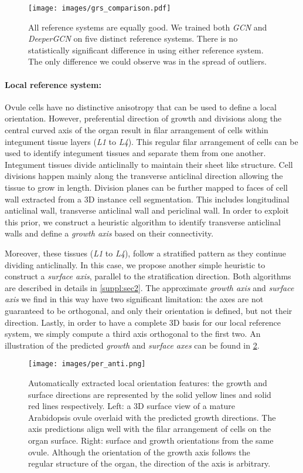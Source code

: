 \documentclass[10pt,twocolumn,letterpaper]{article}
\begin{document}
\begin{figure}
    \centering
    \texttt{[image: images/grs\_comparison.pdf]}
  \caption{All reference systems are equally good. We trained both \textit{GCN} and \textit{DeeperGCN} on five distinct reference systems. There is no statistically significant difference in using either reference system. The only difference we could observe was in the spread of outliers.}
  \label{fig:grs_stability}
\end{figure}

\paragraph{Local reference system:}
Ovule cells have no distinctive anisotropy that can be used to define a local orientation.
However, preferential direction of growth and divisions along the central curved axis of the organ result in filar arrangement of cells within integument tissue layers (\textit{L1} to \textit{L4}). This regular filar arrangement of cells can be used to identify integument tissues and separate them from one another. Integument tissues divide anticlinally to maintain their sheet like structure. Cell divisions happen mainly along the transverse anticlinal direction allowing the tissue to grow in length. Division planes can be further mapped to faces of cell wall extracted from a 3D instance cell segmentation. This includes longitudinal anticlinal wall, transverse anticlinal wall and periclinal wall. In order to exploit this prior, we construct a heuristic algorithm to identify transverse anticlinal walls and define a \textit{growth axis} based on their connectivity.

Moreover, these tissues (\textit{L1} to \textit{L4}), follow a stratified pattern as they continue dividing anticlinally. In this case, we propose another simple heuristic to construct a \textit{surface axis}, parallel to the stratification direction.
Both algorithms are described in details in \cref{suppl:sec2}.
The approximate \textit{growth axis} and \textit{surface axis} we find in this way have two significant limitation: the axes are not guaranteed to be orthogonal, and only their orientation is defined, but not their direction. Lastly, in order to have a complete 3D basis for our local reference system, we simply compute a third axis orthogonal to the first two. An illustration of the predicted \textit{growth} and \textit{surface axes} can be found in \cref{fig:per_anti}.

\begin{figure}
  \centering
  \texttt{[image: images/per\_anti.png]}
  \caption{Automatically extracted local orientation features: the growth and surface directions are represented by the solid yellow lines and solid red lines respectively. Left: a 3D surface view of a mature Arabidopsis ovule overlaid with the predicted growth directions. The axis predictions align well with the filar arrangement of cells on the organ surface. Right: surface and growth orientations from the same ovule. Although the orientation of the growth axis follows the regular structure of the organ, the direction of the axis is arbitrary.}
  \label{fig:per_anti}
\end{figure}
\end{document}
